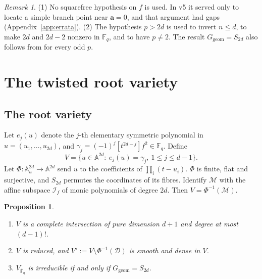 \documentclass[11pt,a4paper]{article}
\newtheorem{proposition}[theorem]{Proposition}
\theoremstyle{definition}
\theoremstyle{remark}
\newtheorem{remark}[theorem]{Remark}
\newcommand{\Fq}{\mathbb{F}_q}
\newcommand{\Fqbar}{\overline{\mathbb{F}}_q}
\newcommand{\A}{\mathbb{A}}
\newcommand{\Ggeom}{G_{\mathrm{geom}}}
\newcommand{\cI}{\mathcal{I}}
\newcommand{\cM}{\mathcal{M}}
\newcommand{\ba}{\mathbf{a}}
\begin{document}
\begin{remark}
(1) No squarefree hypothesis on $f$ is used. In v5 it served only to locate a simple
branch point near $\ba=0$, and that argument had gaps (Appendix~\ref{app:errata}).
(2) The hypothesis $p>2d$ is used to invert $n\le d$, to make $2d$ and $2d-2$ nonzero
in $\Fq$, and to have $p\ne2$. The result $\Ggeom=S_{2d}$ also follows from
\cite[Prop.~3.6]{BBR2015} for every odd $p$.
\end{remark}

\section{The twisted root variety}\label{sec:twisted}

\subsection{The root variety}
Let $e_j(u)$ denote the $j$-th elementary symmetric polynomial in $u=(u_1,\dots,u_{2d})$,
and $\gamma_j=(-1)^j[t^{2d-j}]f^2\in\Fq$. Define
\[
  V=\{u\in\A^{2d}:\ e_j(u)=\gamma_j,\ 1\le j\le d-1\}.
\]
Let $\Phi:\A^{2d}_u\to\A^{2d}$ send $u$ to the coefficients of $\prod_i(t-u_i)$.
$\Phi$ is finite, flat and surjective, and $S_{2d}$ permutes the coordinates of its fibres.
Identify $\cM$ with the affine subspace $\cI_f$ of monic polynomials of degree $2d$.
Then $V=\Phi^{-1}(\cM)$.

\begin{proposition}\label{prop:V}
\begin{enumerate}[label=(\alph*),nosep]
\item $V$ is a complete intersection of pure dimension $d+1$ and degree at most $(d-1)!$.
\item $V$ is reduced, and $V^\circ:=V\setminus\Phi^{-1}(\mathcal D)$ is smooth and dense in $V$.
\item $V_{\Fqbar}$ is irreducible if and only if $\Ggeom=S_{2d}$.
\end{enumerate}
\end{proposition}
\end{document}
